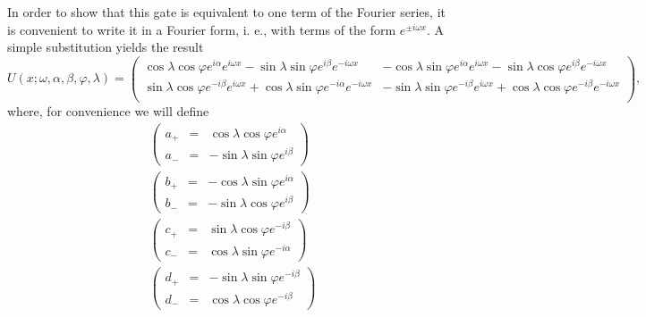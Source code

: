 \documentclass[aps,amssymb,amsmath,amsfonts,pra,superscriptaddress,onecolumn]{revtex4}
\begin{document}
In order to show that this gate is equivalent to one term of the Fourier series, it is convenient to write it in a Fourier form, i. e., with terms of the form $e^{\pm i \omega x}$. A simple substitution yields the result
\begin{equation}\label{eq:unitary_2}
    U(x; \omega, \alpha, \beta, \varphi, \lambda) = 
    \begin{pmatrix}
    \cos\lambda \cos\varphi e^{i \alpha} e^{i\omega x} - \sin\lambda \sin\varphi e^{i \beta} e^{- i \omega x} & 
    -\cos\lambda \sin\varphi e^{i \alpha} e^{i\omega x} - \sin\lambda \cos\varphi e^{i \beta} e^{- i \omega x} \\
    \sin\lambda \cos\varphi e^{-i \beta} e^{i\omega x} + \cos\lambda \sin\varphi e^{-i \alpha} e^{- i \omega x} & 
    -\sin\lambda \sin\varphi e^{-i \beta} e^{i\omega x} + \cos\lambda \cos\varphi e^{-i \beta} e^{- i \omega x} \\
    \end{pmatrix},
\end{equation}
where, for convenience we will define
\begin{eqnarray}
\begin{pmatrix}
    a_+ & = & \cos\lambda \cos\varphi e^{i \alpha} \\
    a_- &  = & -\sin\lambda \sin\varphi e^{i \beta}
\end{pmatrix} \\
\begin{pmatrix}
    b_+ & = & -\cos\lambda \sin\varphi e^{i \alpha} \\
    b_- & = & - \sin\lambda \cos\varphi e^{i \beta}
\end{pmatrix} \\
\begin{pmatrix}
    c_+ & = & \sin\lambda \cos\varphi e^{-i \beta} \\
     c_- & = & \cos\lambda \sin\varphi e^{-i \alpha} 
\end{pmatrix} \\
\begin{pmatrix}
    d_+ & = & -\sin\lambda \sin\varphi e^{-i \beta}\\
     d_- & = & \cos\lambda \cos\varphi e^{-i \beta} 
\end{pmatrix}
\end{eqnarray}
\end{document}
